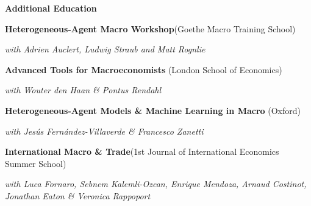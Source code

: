 \documentclass[letterpaper,10pt,oneside]{article}
\begin{document}
\noindent \large \textbf{Additional Education}
\vspace{3mm}

\noindent \normalsize \textbf{Heterogeneous-Agent Macro Workshop}(Goethe Macro Training School) \hfill \begin{minipage}[t]{2cm}
\end{minipage}

\noindent \textit{with Adrien Auclert, Ludwig Straub and Matt Rognlie }

\vspace{3mm}

\noindent \normalsize \textbf{Advanced Tools for Macroeconomists} (London School of Economics) \hfill \begin{minipage}[t]{4cm}
\end{minipage} 

\noindent \textit{with Wouter den Haan \& Pontus Rendahl}

\vspace{3mm}

\noindent \normalsize \textbf{Heterogeneous-Agent Models \& Machine Learning in Macro }(Oxford) \hfill \begin{minipage}[t]{2cm}
\end{minipage}

\noindent \textit{with Jesús Fernández-Villaverde \& Francesco Zanetti}

\vspace{3mm}

\noindent \normalsize \textbf{International Macro \& Trade}(1st Journal of International Economics Summer School) \hfill \begin{minipage}[t]{2cm}
\end{minipage}

\noindent \textit{with Luca Fornaro, Sebnem Kalemli-Ozcan, Enrique Mendoza, Arnaud Costinot, Jonathan Eaton \& Veronica Rappoport} 
\end{document}
